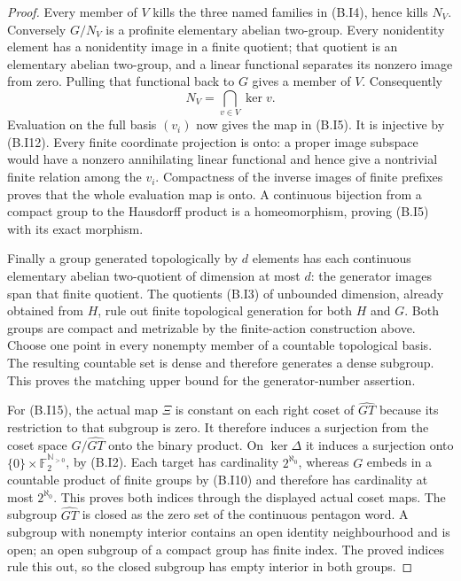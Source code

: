 \begin{proof}
Every member of $V$ kills the three named families in
(B.I4), hence kills $N_V$.  Conversely $G/N_V$ is a
profinite elementary abelian two-group.  Every nonidentity
element has a nonidentity image in a finite quotient;
that quotient is an elementary abelian two-group, and a
linear functional separates its nonzero image from zero.
Pulling that functional back to $G$ gives a member of
$V$.  Consequently
\[
                         N_V=\bigcap_{v\in V}\ker v.
                                                        \tag{B.I12}
\]
Evaluation on the full basis $(v_i)$ now gives the map in
(B.I5).  It is injective by (B.I12).  Every finite coordinate
projection is onto: a proper image subspace would have a
nonzero annihilating linear functional and hence give a
nontrivial finite relation among the $v_i$.  Compactness
of the inverse images of finite prefixes proves that the
whole evaluation map is onto.  A continuous bijection
from a compact group to the Hausdorff product is a
homeomorphism, proving (B.I5) with its exact morphism.

Finally a group generated topologically by $d$ elements
has each continuous elementary abelian two-quotient of
dimension at most $d$: the generator images span that
finite quotient.  The quotients (B.I3) of unbounded
dimension, already obtained from $H$, rule out finite
topological generation for both $H$ and $G$. Both groups
are compact and metrizable by the finite-action construction
above. Choose one point in every nonempty member of a
countable topological basis. The resulting countable set
is dense and therefore generates a dense subgroup. This
proves the matching upper bound for the generator-number assertion.

For (B.I15), the actual map $\Xi$ is constant on each
right coset of $\widehat{GT}$ because its restriction to
that subgroup is zero. It therefore induces a surjection
from the coset space $G/\widehat{GT}$ onto the binary
product. On $\ker\Delta$ it induces a surjection onto
$\{0\}\times\mathbb F_2^{\mathbb N_{>0}}$, by (B.I2).
Each target has cardinality $2^{\aleph_0}$, whereas $G$
embeds in a countable product of finite groups by (B.I10)
and therefore has cardinality at most $2^{\aleph_0}$.
This proves both indices through the displayed actual
coset maps. The subgroup $\widehat{GT}$ is closed as the
zero set of the continuous pentagon word. A subgroup
with nonempty interior contains an open identity
neighbourhood and is open; an open subgroup of a compact
group has finite index. The proved indices rule this out,
so the closed subgroup has empty interior in both groups.
\end{proof}

